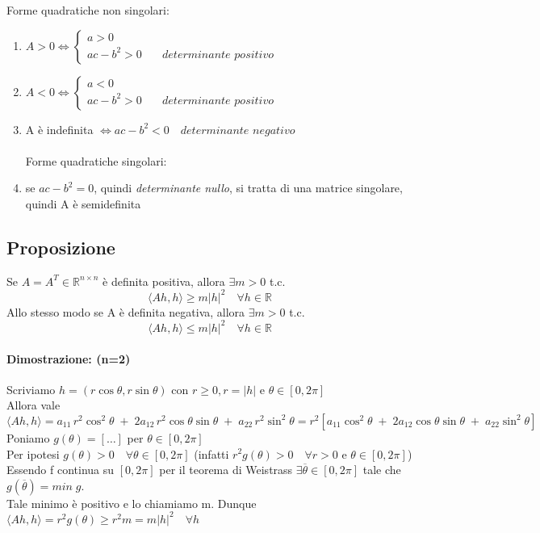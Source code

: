\documentclass[12pt]{article}
\newcommand {\R}{\mathbb{R}}
\begin{document}
Forme quadratiche non singolari:
\begin{enumerate}
    \item $A > 0 \Leftrightarrow
              \begin{cases}
                  a > 0                                             \\
                  ac-b^2 > 0 & \quad \textit{determinante positivo}
              \end{cases} $
    \item $A < 0 \Leftrightarrow
              \begin{cases}
                  a < 0                                             \\
                  ac-b^2 > 0 & \quad \textit{determinante positivo}
              \end{cases} $
    \item A è indefinita $\Leftrightarrow ac-b^2<0 \quad \textit{determinante negativo}$
          \\
          \\Forme quadratiche singolari:
    \item se $ac-b^2 = 0$, quindi \textit{determinante nullo}, si tratta di una matrice singolare, quindi A è semidefinita
\end{enumerate}

\subsection{Proposizione}

Se $A = A^T \in \R^{n\times n}$ è definita positiva,
allora $\exists m >0$ t.c. $$\langle Ah, h\rangle \geq m \lvert h \rvert ^2 \quad \forall h \in \R$$
Allo stesso modo se A è definita negativa, allora $\exists m >0$ t.c. $$\langle Ah, h\rangle \leq m \left\lvert h \right\rvert ^2 \quad \forall h \in \R$$

\paragraph*{Dimostrazione: (n=2)}
Scriviamo $h=(r\cos\theta , r\sin\theta)$ con $r\geq 0, r = \lvert h\rvert$ e $\theta \in [0, 2\pi]$\\
Allora vale $\langle Ah, h\rangle = a_{11}\,r^2\cos^2 \theta\;+\; 2a_{12}\,r^2\cos\theta\sin\theta\;+\;a_{22}\,r^2\sin^2\theta = r^2[a_{11}\cos^2 \theta\;+\; 2a_{12}\cos\theta\sin\theta\;+\;a_{22}\sin^2\theta]$\\
Poniamo $g(\theta) = [\dots]$ per $\theta \in [0, 2\pi]$\\
Per ipotesi $g(\theta) > 0 \quad \forall \theta \in [0, 2\pi]$ (infatti $r^2g(\theta)>0 \quad \forall r>0$ e $\theta \in [0, 2\pi]$)\\
Essendo f continua su $[0, 2\pi]$ per il teorema di Weistrass $\exists \overline{\theta} \in [0, 2\pi]$ tale che $g(\overline{\theta}) = min\;g$.\\
Tale minimo è positivo e lo chiamiamo m. Dunque $\langle Ah, h\rangle = r^2g(\theta) \geq r^2m = m \lvert h \rvert^2 \quad \forall h$\\
\end{document}

